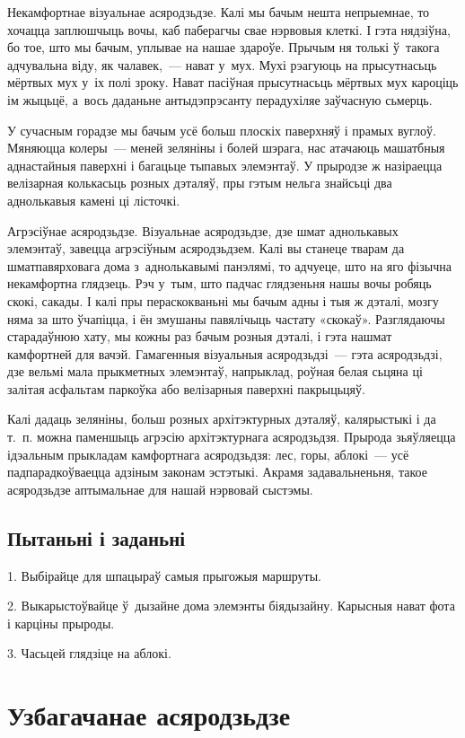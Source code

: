 Некамфортнае візуальнае асяродзьдзе. Калі мы бачым нешта непрыемнае, то хочацца заплюшчыць вочы, каб паберагчы свае нэрвовыя клеткі. І гэта нядзіўна, бо тое, што мы бачым, уплывае на нашае здароўе. Прычым ня толькі ў~такога адчувальна віду, як чалавек,~--- нават у~мух. Мухі рэагуюць на прысутнасьць мёртвых мух у~іх полі зроку. Нават пасіўная прысутнасьць мёртвых мух кароціць ім жыцьцё, а~вось даданьне антыдэпрэсанту перадухіляе заўчасную сьмерць.

У сучасным горадзе мы бачым усё больш плоскіх паверхняў і прамых вуглоў. Мяняюцца колеры~--- меней зеляніны і болей шэрага, нас атачаюць машатбныя аднастайныя паверхні і багацьце тыпавых элемэнтаў. У прыродзе ж назіраецца велізарная колькасьць розных дэталяў, пры гэтым нельга знайсьці два аднолькавыя камені ці лісточкі.

Агрэсіўнае асяродзьдзе. Візуальнае асяродзьдзе, дзе шмат аднолькавых элемэнтаў, завецца агрэсіўным асяродзьдзем. Калі вы станеце тварам да шматпавярховага дома з~аднолькавымі панэлямі, то адчуеце, што на яго фізычна некамфортна глядзець. Рэч у~тым, што падчас глядзеньня нашы вочы робяць скокі, сакады. І калі пры пераскокваньні мы бачым адны і тыя ж дэталі, мозгу няма за што ўчапіцца, і ён змушаны павялічыць частату «скокаў». Разглядаючы старадаўнюю хату, мы кожны раз бачым розныя дэталі, і гэта нашмат камфортней для вачэй. Гамагенныя візуальныя асяродзьдзі~--- гэта асяродзьдзі, дзе вельмі мала прыкметных элемэнтаў, напрыклад, роўная белая сьцяна ці залітая асфальтам паркоўка або велізарныя паверхні пакрыцьцяў.

Калі дадаць зеляніны, больш розных архітэктурных дэталяў, калярыстыкі і да т.~п. можна паменшыць агрэсію архітэктурнага асяродзьдзя. Прырода зьяўляецца ідэальным прыкладам камфортнага асяродзьдзя: лес, горы, аблокі~--- усё падпарадкоўваецца адзіным законам эстэтыкі. Акрамя задавальненьня, такое асяродзьдзе аптымальнае для нашай нэрвовай сыстэмы.

\subsection*{Пытаньні і заданьні}

1. Выбірайце для шпацыраў самыя прыгожыя маршруты.

2. Выкарыстоўвайце ў~дызайне дома элемэнты біядызайну. Карысныя нават фота і карціны прыроды.

3. Часьцей глядзіце на аблокі.


\section{Узбагачанае асяродзьдзе}


